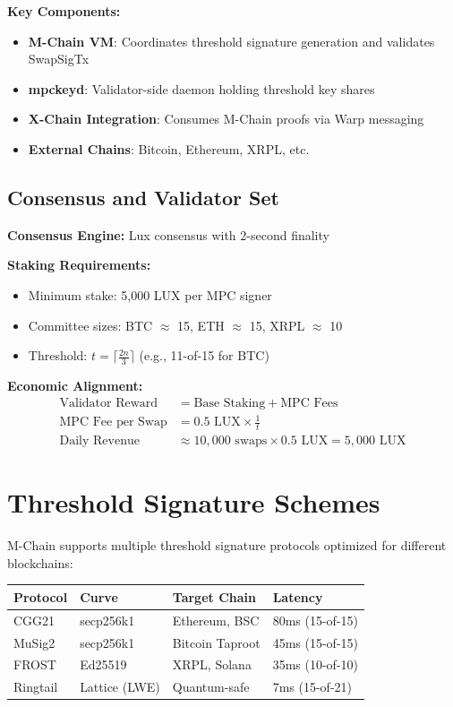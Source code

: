 \documentclass[11pt]{article}
\begin{document}
\textbf{Key Components:}
\begin{itemize}
\item \textbf{M-Chain VM}: Coordinates threshold signature generation and validates SwapSigTx
\item \textbf{mpckeyd}: Validator-side daemon holding threshold key shares
\item \textbf{X-Chain Integration}: Consumes M-Chain proofs via Warp messaging
\item \textbf{External Chains}: Bitcoin, Ethereum, XRPL, etc.
\end{itemize}

\subsection{Consensus and Validator Set}

\textbf{Consensus Engine:} Lux consensus with 2-second finality

\textbf{Staking Requirements:}
\begin{itemize}
\item Minimum stake: 5,000 LUX per MPC signer
\item Committee sizes: BTC $\approx$ 15, ETH $\approx$ 15, XRPL $\approx$ 10
\item Threshold: $t = \lceil \frac{2n}{3} \rceil$ (e.g., 11-of-15 for BTC)
\end{itemize}

\textbf{Economic Alignment:}
\begin{align}
\text{Validator Reward} &= \text{Base Staking} + \text{MPC Fees} \\
\text{MPC Fee per Swap} &= 0.5 \text{ LUX} \times \frac{1}{t} \\
\text{Daily Revenue} &\approx 10{,}000 \text{ swaps} \times 0.5 \text{ LUX} = 5{,}000 \text{ LUX}
\end{align}

\section{Threshold Signature Schemes}

M-Chain supports multiple threshold signature protocols optimized for different blockchains:

\begin{table}[h]
\centering
\begin{tabular}{@{}llll@{}}
\toprule
\textbf{Protocol} & \textbf{Curve} & \textbf{Target Chain} & \textbf{Latency} \\
\midrule
CGG21 & secp256k1 & Ethereum, BSC & 80ms (15-of-15) \\
MuSig2 & secp256k1 & Bitcoin Taproot & 45ms (15-of-15) \\
FROST & Ed25519 & XRPL, Solana & 35ms (10-of-10) \\
Ringtail & Lattice (LWE) & Quantum-safe & 7ms (15-of-21) \\
\bottomrule
\end{tabular}

\label{tab:threshold-schemes}
\end{table}
\end{document}
